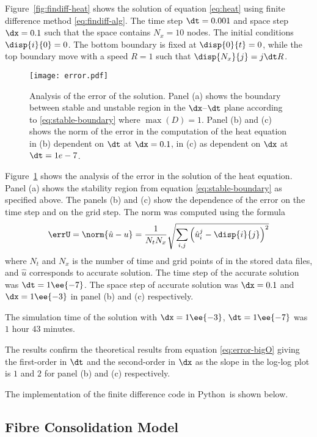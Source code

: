 \documentclass[twoside,a4paper,12pt]{article}
\newcommand{\figref}[1]{Figure~\ref{#1}}
\newcommand{\prog}[1]{\textsf{#1}}
\newcommand{\python}{\prog{Python}}
\begin{document}
\figref{fig:findiff-heat} shows the solution of equation
\eqref{eq:heat} using finite difference method
\eqref{eq:findiff-alg}. The time step $\dt=0.001$ and space step
$\dx = 0.1$ such that the space contains $N_x=10$ nodes. The initial
conditions $\disp{i}{0} = 0$. The bottom boundary is fixed at
$\disp{0}{t} = 0$, while the top boundary move with a speed $R=1$ such
that $\disp{N_x}{j} = j \dt R$.


\begin{figure}
  \centering
  \texttt{[image: error.pdf]}
  \caption{Analysis of the error of the solution. Panel (a) shows the
    boundary between stable and unstable region in the $\dx$--$\dt$
    plane according to \eqref{eq:stable-boundary} where $\max(D) =
    1$. Panel (b) and (c) shows the norm of the error in the
    computation of the heat equation in (b) dependent on $\dt$ at
    $\dx=0.1$, in (c) as dependent on $\dx$ at $\dt=1e-7$.}
  \label{fig:error-analysis}
\end{figure}

\figref{fig:error-analysis} shows the analysis of the error in the
solution of the heat equation. Panel (a) shows the stability region
from equation \eqref{eq:stable-boundary} as specified above. The
panels (b) and (c) show the dependence of the error on the time step
and on the grid step. The norm was computed using the formula
%
\begin{align}
  \errU = \norm{\hat{u} - u} = \frac{1}{N_t N_x}\sqrt{ \sum_{i,j} \left(\hat{u}_{i}^{j} - \disp{i}{j}\right)^2}
\end{align}
where $N_t$ and $N_x$ is the number of time and grid points of in the
stored data files, and $\hat{u}$ corresponds to accurate solution. The
time step of the accurate solution was $\dt = 1\ee{-7}$. The space step
of accurate solution was $\dx=0.1$ and $\dx=1\ee{-3}$ in panel (b) and
(c) respectively.

The simulation time of the solution with $\dx=1\ee{-3}$, $\dt=1\ee{-7}$
was $1$ hour $43$ minutes.

The results confirm the theoretical results from equation
\eqref{eq:error-bigO} giving the first-order in $\dt$ and the
second-order in $\dx$ as the slope in the log-log plot is $1$ and $2$
for panel (b) and (c) respectively.

The implementation of the finite difference code in \python\ is shown
below.
%


\subsection{Fibre Consolidation Model}
\end{document}
